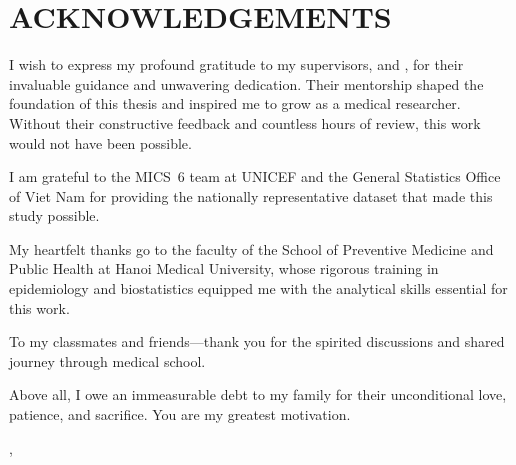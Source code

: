 \chapter*{ACKNOWLEDGEMENTS}
{}

I wish to express my profound gratitude to my supervisors, \textbf{\SupervisorNameA} and \textbf{\SupervisorNameB}, for their invaluable guidance and unwavering dedication. Their mentorship shaped the foundation of this thesis and inspired me to grow as a medical researcher. Without their constructive feedback and countless hours of review, this work would not have been possible.

I am grateful to the MICS~6 team at UNICEF and the General Statistics Office of Viet Nam for providing the nationally representative dataset that made this study possible.

My heartfelt thanks go to the faculty of the School of Preventive Medicine and Public Health at Hanoi Medical University, whose rigorous training in epidemiology and biostatistics equipped me with the analytical skills essential for this work.

To my classmates and friends---thank you for the spirited discussions and shared journey through medical school.

Above all, I owe an immeasurable debt to my family for their unconditional love, patience, and sacrifice. You are my greatest motivation.

\begin{flushright}
\SubmissionCity, \SubmissionYear\\[0.3cm]
\textbf{\StudentName}
\end{flushright}

\clearpage
